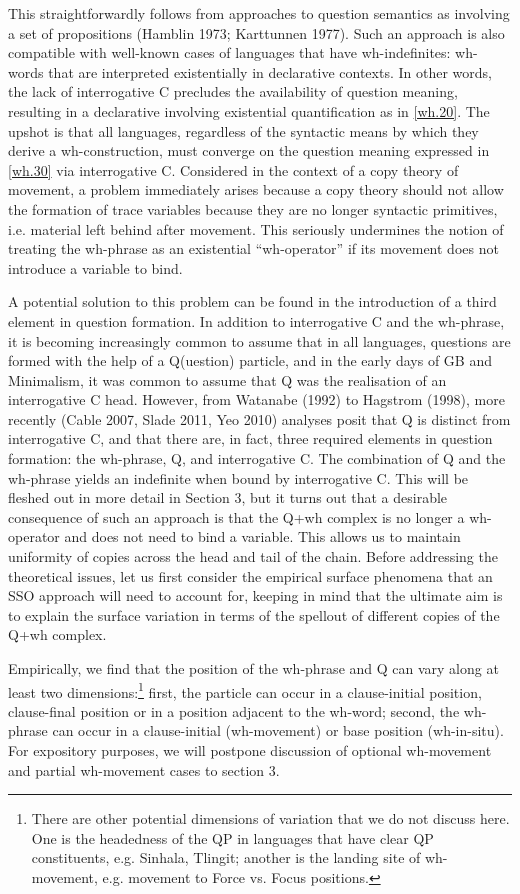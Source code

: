 \documentclass{glossa}
\begin{document}
This straightforwardly follows from approaches to question semantics as involving a set of propositions (Hamblin 1973; Karttunnen 1977). Such an approach is also compatible with well-known cases of languages that have wh-indefinites: wh-words that are interpreted existentially in declarative contexts. In other words, the lack of interrogative C precludes the availability of question meaning, resulting in a declarative involving existential quantification as in \ref{wh.20}. The upshot is that all languages, regardless of the syntactic means by which they derive a wh-construction, must converge on the question meaning expressed in \ref{wh.30} via interrogative C. Considered in the context of a copy theory of movement, a problem immediately arises because a copy theory should not allow the formation of trace variables because they are no longer syntactic primitives, i.e. material left behind after movement. This seriously undermines the notion of treating the wh-phrase as an existential ``wh-operator'' if its movement does not introduce a variable to bind.

A potential solution to this problem can be found in the introduction of a third element in question formation. In addition to interrogative C and the wh-phrase, it is becoming increasingly common to assume that in all languages, questions are formed with the help of a Q(uestion) particle, and in the early days of GB and Minimalism, it was common to assume that Q was the realisation of an interrogative C head. However, from Watanabe (1992) to Hagstrom (1998), more recently (Cable 2007, Slade 2011, Yeo 2010) analyses posit that Q is distinct from interrogative C, and that there are, in fact, three required elements in question formation: the wh-phrase, Q, and interrogative C. The combination of Q and the wh-phrase yields an indefinite when bound by interrogative C. This will be fleshed out in more detail in Section 3, but it turns out that a desirable consequence of such an approach is that the Q+wh complex is no longer a wh-operator and does not need to bind a variable. This allows us to maintain uniformity of copies across the head and tail of the chain. Before addressing the theoretical issues, let us first consider the empirical surface phenomena that an SSO approach will need to account for, keeping in mind that the ultimate aim is to explain the surface variation in terms of the spellout of different copies of the Q+wh complex.

Empirically, we find that the position of the wh-phrase and Q can vary along at least two dimensions:\footnote{There are other potential dimensions of variation that we do not discuss here. One is the headedness of the QP in languages that have clear QP constituents, e.g. Sinhala, Tlingit; another is the landing site of wh-movement, e.g. movement to Force vs. Focus positions.} first, the particle can occur in a clause-initial position, clause-final position or in a position adjacent to the wh-word; second, the wh-phrase can occur in a clause-initial (wh-movement) or base position (wh-in-situ). For expository purposes, we will postpone discussion of optional wh-movement and partial wh-movement cases to section 3.
\end{document}
